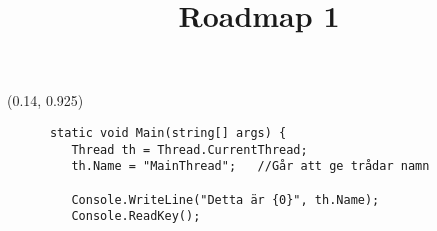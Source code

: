 \documentclass{uioposter}
\title{Roadmap 1}
\institute
{
    \ExecuteMetaData[Summary]{subsubtitle}
}
\begin{document}
\begin{frame}

\begin{multicols}{2}
\end{multicols}

\begin{textblock}{1}(0.14, 0.925)
\begin{multicols}{2}[]
    \begin{verbatim}
      static void Main(string[] args) {
         Thread th = Thread.CurrentThread;
         th.Name = "MainThread";   //Går att ge trådar namn

         Console.WriteLine("Detta är {0}", th.Name);
         Console.ReadKey();
    \end{verbatim}
\end{multicols}
\end{textblock}
\end{frame}
\end{document}

